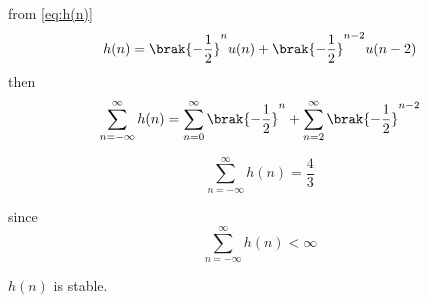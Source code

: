 \documentclass[journal,12pt,twocolumn]{IEEEtran}
\renewcommand\thesection{\arabic{section}}
\begin{document}
\begin{enumerate}[label=\thesection.\arabic*]
\solution from \ref{eq:h(n)}
\begin{equation}
    h(n) = \brak{-\frac{1}{2}}^{n}u(n) + \brak{-\frac{1}{2}}^{n-2}u(n-2) 
\end{equation}
then 
\begin{equation}
    \sum_{n=-\infty}^{\infty}h(n) = \sum_{n=0}^{\infty} \brak{-\frac{1}{2}}^{n} + \sum_{n=2}^{\infty} \brak{-\frac{1}{2}}^{n-2}
\end{equation}

\begin{equation}
    \sum_{n=-\infty}^{\infty}h(n) = \frac{4}{3}
\end{equation}

since 
\begin{equation}
    \sum_{n=-\infty}^{\infty}h(n) < \infty
\end{equation}

$h(n)$ is stable.


\end{enumerate}
\end{document}
